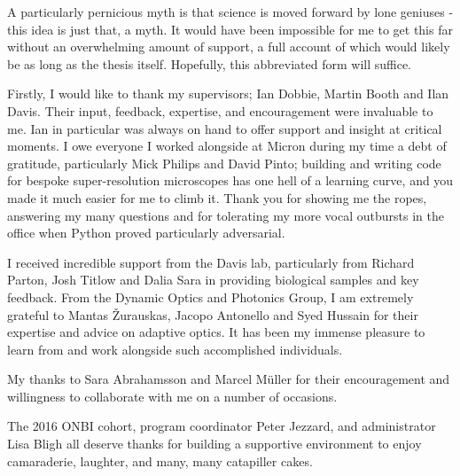 \begin{acknowledgements}
	
	\vspace{-0.75cm}
	
	{\small %
		
		A particularly pernicious myth is that science is moved forward by 
		lone geniuses - this idea is just that, a myth. It would have been 
		impossible for me to get this far without an overwhelming amount of 
		support, a full account of which would likely be as long as the 
		thesis itself. Hopefully, this abbreviated form  will suffice.
		
		Firstly, I would like to thank my supervisors; Ian Dobbie, Martin 
		Booth and Ilan Davis. Their input, feedback, expertise, and 
		encouragement were invaluable to me. Ian in particular was always 
		on hand to offer support and insight at critical moments. I owe 
		everyone I worked alongside at Micron during my time a debt of 
		gratitude, particularly Mick Philips and David Pinto; building and 
		writing code for bespoke super-resolution microscopes has one hell 
		of a learning curve, and you made it much easier for me to climb 
		it. Thank you for showing me the ropes, answering my many questions 
		and for tolerating my more vocal outbursts in the office when 
		Python proved particularly adversarial. 
		
		I received incredible support from the Davis lab, particularly from Richard Parton, Josh Titlow and Dalia Sara in providing biological 
		samples and key feedback. From the Dynamic Optics and Photonics 
		Group, I am extremely grateful to Mantas \v{Z}urauskas, Jacopo 
		Antonello and Syed Hussain for their expertise and advice on 
		adaptive optics. It has been my immense pleasure to learn from and 
		work alongside such accomplished individuals. 
		
		My thanks to Sara Abrahamsson and Marcel M\"{u}ller for their encouragement and willingness to collaborate with me on a number of occasions. 
		
		The 2016 ONBI cohort, program coordinator Peter Jezzard, and 
		administrator Lisa Bligh all deserve thanks for building a 
		supportive environment to enjoy camaraderie, laughter, and many, 
		many catapiller cakes.
		
}
\end{acknowledgements}

